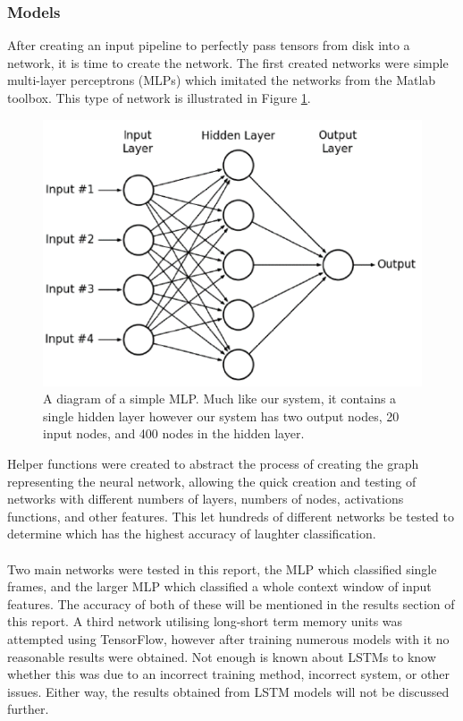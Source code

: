 \documentclass[a4paper,11pt,notitlepage]{article}
\begin{document}
\subsubsection{Models}


After creating an input pipeline to perfectly pass tensors from disk into a network, it is time to create the network. The first created networks were simple multi-layer perceptrons (MLPs) which imitated the networks from the Matlab toolbox. This type of network is illustrated in Figure \ref{mlp_example}.

\begin{figure}[H]
	\centering
	\vspace{0.5cm}
	\includegraphics[scale = 0.75]{figs/mlp.png}
	\caption{A diagram of a simple MLP. Much like our system, it contains a single hidden layer however our system has two output nodes, 20 input nodes, and 400 nodes in the hidden layer.}
	\label{mlp_example}
\end{figure}

\noindent
Helper functions were created to abstract the process of creating the graph representing the neural network, allowing the quick creation and testing of networks with different numbers of layers, numbers of nodes, activations functions, and other features. This let hundreds of different networks be tested to determine which has the highest accuracy of laughter classification.\\
\\
Two main networks were tested in this report, the MLP which classified single frames, and the larger MLP which classified a whole context window of input features. The accuracy of both of these will be mentioned in the results section of this report. A third network utilising long-short term memory units was attempted using TensorFlow, however after training numerous models with it no reasonable results were obtained. Not enough is known about LSTMs to know whether this was due to an incorrect training method, incorrect system, or other issues. Either way, the results obtained from LSTM models will not be discussed further.
\end{document}
